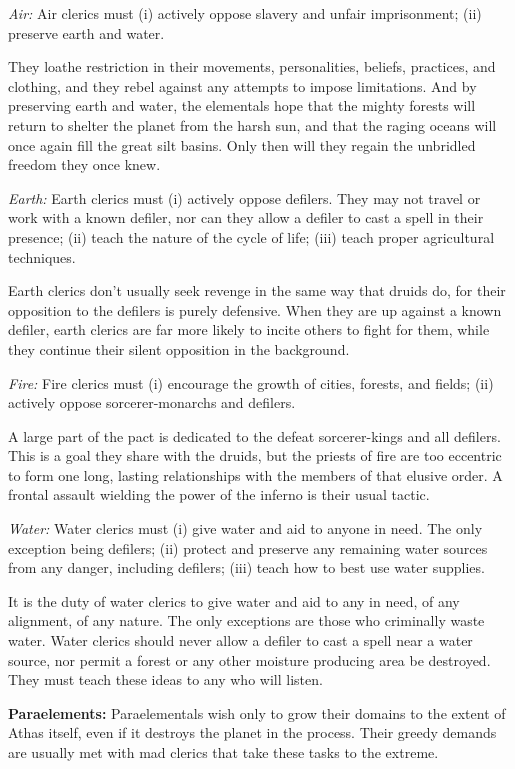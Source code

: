 \textit{Air:} Air clerics must
	(i) actively oppose slavery and unfair imprisonment;
	(ii) preserve earth and water.

They loathe restriction in their movements, personalities, beliefs, practices, and clothing, and they rebel against any attempts to impose limitations. And by preserving earth and water, the elementals hope that the mighty forests will return to shelter the planet from the harsh sun, and that the raging oceans will once again fill the great silt basins. Only then will they regain the unbridled freedom they once knew.

\textit{Earth:} Earth clerics must
	(i) actively oppose defilers. They may not travel or work with a known defiler, nor can they allow a defiler to cast a spell in their presence;
	(ii) teach the nature of the cycle of life;
	(iii) teach proper agricultural techniques.

Earth clerics don't usually seek revenge in the same way that druids do, for their opposition to the defilers is purely defensive. When they are up against a known defiler, earth clerics are far more likely to incite others to fight for them, while they continue their silent opposition in the background.

\textit{Fire:} Fire clerics must
	(i) encourage the growth of cities, forests, and fields;
	(ii) actively oppose sorcerer-monarchs and defilers.

A large part of the pact is dedicated to the defeat sorcerer-kings and all defilers. This is a goal they share with the druids, but the priests of fire are too eccentric to form one long, lasting relationships with the members of that elusive order. A frontal assault wielding the power of the inferno is their usual tactic.

\textit{Water:} Water clerics must
	(i) give water and aid to anyone in need. The only exception being defilers;
	(ii) protect and preserve any remaining water sources from any danger, including defilers;
	(iii) teach how to best use water supplies.

It is the duty of water clerics to give water and aid to any in need, of any alignment, of any nature. The only exceptions are those who criminally waste water. Water clerics should never allow a defiler to cast a spell near a water source, nor permit a forest or any other moisture producing area be destroyed. They must teach these ideas to any who will listen.

\textbf{Paraelements:} Paraelementals wish only to grow their domains to the extent of Athas itself, even if it destroys the planet in the process. Their greedy demands are usually met with mad clerics that take these tasks to the extreme.

